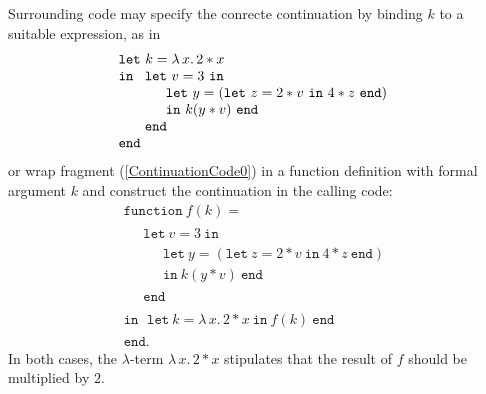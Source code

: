 Surrounding code may specify the conrecte continuation by
binding $k$ to a suitable expression, as in
$$\begin{array}{l}
\mathtt{let}\ k = \lambda\, x .\, 2* x\\ 
\mathtt{in}\ 
  \begin{array}[t]{l}
    \mathtt{let}\ v = 3\ \mathtt{in}\\
    \quad \begin{array}{l} 
      \mathtt{let}\ y = (\mathtt{let}\ z=2*v \ \mathtt{in}\ 4*z\ \mathtt{end})\\
      \mathtt{in}\ k (y*v)\ \mathtt{end}
    \end{array}\\
    \mathtt{end}
  \end{array}\\ 
\mathtt{end}
\end{array}
$$
or wrap fragment (\ref{ContinuationCode0}) in a function definition
with formal argument $k$ and construct the continuation in the calling
code:
\begin{equation}
\label{ContinuationCode1}
\begin{array}{l}
\mathtt{function}\ f (k) =\\
\quad 
\begin{array}{l}
  \mathtt{let}\ v = 3\ \mathtt{in}\\
  \quad \begin{array}{l} 
    \mathtt{let}\ y = (\mathtt{let}\ z=2*v \ \mathtt{in}\ 4*z\ \mathtt{end})\\
    \mathtt{in}\ k (y*v)\ \mathtt{end}
  \end{array}\\
  \mathtt{end}
  \end{array}\\
\mathtt{in}\
  \begin{array}{l}
  \mathtt{let}\ k = \lambda\, x .\, 2* x\ \mathtt{in}\ f(k)\ \mathtt{end}
  \end{array}\\
\mathtt{end}.
\end{array}
\end{equation}
In both cases,  the $\lambda$-term $\lambda\, x .\, 2* x$ stipulates that the
result of $f$ should be multiplied by $2$. 


